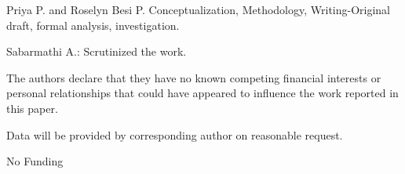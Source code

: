 \documentclass[10pt]{NSP1}
\begin{document}
\par\medskip{}\smallskip

Priya P. and Roselyn Besi P. Conceptualization, Methodology, Writing-Original draft, formal analysis, investigation.

Sabarmathi A.: Scrutinized the work.

\par\medskip{}\smallskip

The authors declare that they have no known competing financial interests or personal relationships that could have appeared to influence the work reported in this paper.

\par\medskip{}\smallskip

Data will be provided by corresponding author on reasonable request.

\par\medskip{}\smallskip

No Funding
\end{document}

